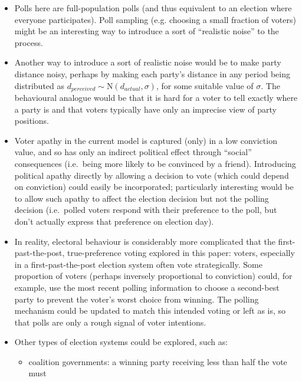 \documentclass[12pt]{article}
\numberwithin{equation}{subsection}
\begin{document}
\begin{itemize}
    \item
        Polls here are full-population polls (and thus equivalent to an election where everyone
        participates).  Poll sampling (e.g. choosing a small fraction of voters) might be an
        interesting way to introduce a sort of ``realistic noise'' to the process.
    \item
        Another way to introduce a sort of realistic noise would be to make party distance
        noisy, perhaps by making each party's distance in any period being distributed as
        $d_{perceived} \sim \textrm{N}(d_{actual}, \sigma)$, for some suitable value of
        $\sigma$.  The behavioural analogue would be that it is hard for a voter to tell
        exactly where a party is and that voters typically have only an imprecise view of
        party positions.
    \item
        Voter apathy in the current model is captured (only) in a low conviction value, and
        so has only an indirect political effect through ``social'' consequences (i.e.\ being
        more likely to be convinced by a friend).  Introducing political apathy directly by
        allowing a decision to vote (which could depend on conviction) could easily be
        incorporated; particularly interesting would be to allow such apathy to affect the
        election decision but not the polling decision (i.e.\ polled voters respond with
        their preference to the poll, but don't actually express that preference on election
        day).
    \item
        In reality, electoral behaviour is considerably more complicated that the
        first-past-the-post, true-preference voting explored in this paper:
        voters, especially in a first-past-the-post election system often
        vote strategically.  Some proportion of voters (perhaps inversely proportional to
        conviction) could, for example, use the most recent polling information to choose a
        second-best party to prevent the voter's worst choice from winning.  The polling
        mechanism could be updated to match this intended voting or left as is, so that
        polls are only a rough signal of voter intentions.
    \item
        Other types of election systems could be explored, such as:
        \begin{itemize}
            \item
                coalition governments: a winning party receiving less than half the vote must

\end{itemize}
\end{itemize}
\end{document}
